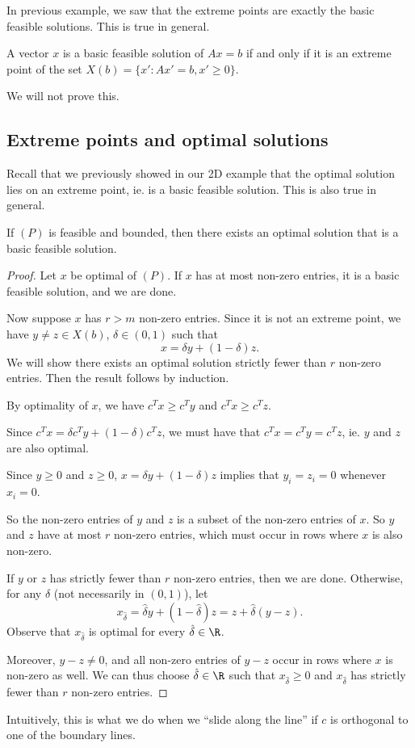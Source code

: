 \documentclass[a4paper]{article}
\begin{document}
In previous example, we saw that the extreme points are exactly the basic feasible solutions. This is true in general.
\begin{thm}[]
  A vector $x$ is a basic feasible solution of $Ax = b$ if and only if it is an extreme point of the set $X(b) = \{x': Ax' = b, x' \geq 0\}$.
\end{thm}
We will not prove this.

\subsection{Extreme points and optimal solutions}
Recall that we previously showed in our 2D example that the optimal solution lies on an extreme point, ie. is a basic feasible solution. This is also true in general.

\begin{thm}
  If $(P)$ is feasible and bounded, then there exists an optimal solution that is a basic feasible solution.
\end{thm}

\begin{proof}
  Let $x$ be optimal of $(P)$. If $x$ has at most non-zero entries, it is a basic feasible solution, and we are done.

  Now suppose $x$ has $r > m$ non-zero entries. Since it is not an extreme point, we have $y\not= z\in X(b)$, $\delta \in (0, 1)$ such that
  \[
    x = \delta y + (1 - \delta) z.
  \]
  We will show there exists an optimal solution strictly fewer than $r$ non-zero entries. Then the result follows by induction.

  By optimality of $x$, we have $c^T x \geq c^T y$ and $c^T x \geq c^T z$.

  Since $c^T x = \delta c^T y + (1 - \delta)c^Tz$, we must have that $c^T x = c^T y = c^T z$, ie. $y$ and $z$ are also optimal.

  Since $y \geq 0$ and $z \geq 0$, $x = \delta y + (1 - \delta) z$ implies that $y_i = z_i = 0$ whenever $x_i = 0$.

  So the non-zero entries of $y$ and $z$ is a subset of the non-zero entries of $x$. So $y$ and $z$ have at most $r$ non-zero entries, which must occur in rows where $x$ is also non-zero.

  If $y$ or $z$ has strictly fewer than $r$ non-zero entries, then we are done. Otherwise, for any $\hat{\delta}$ (not necessarily in $(0, 1)$), let
  \[
    x_{\hat{\delta}} = \hat{\delta} y + (1 - \hat{\delta}) z = z + \hat{\delta}(y - z).
  \]
  Observe that $x_{\hat{\delta}}$ is optimal for every $\hat\delta\in \R$.

  Moreover, $y - z \not= 0$, and all non-zero entries of $y - z$ occur in rows where $x$ is non-zero as well. We can thus choose $\hat\delta\in \R$ such that $x_{\hat{\delta}} \geq 0$ and $x_{\hat{\delta}}$ has strictly fewer than $r$ non-zero entries.
\end{proof}
Intuitively, this is what we do when we ``slide along the line'' if $c$ is orthogonal to one of the boundary lines.
\end{document}
